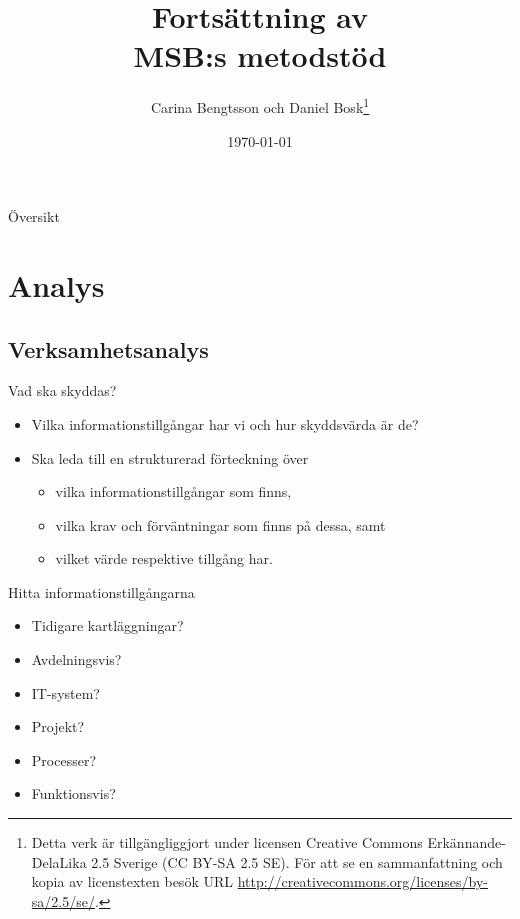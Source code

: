 \documentclass{beamer}
\title[Intro infosäk]{%
  Fortsättning av\\
  MSB:s metodstöd
}
\author{Carina Bengtsson och Daniel Bosk\footnote{%
  Detta verk är tillgängliggjort under licensen Creative Commons 
  Erkännande-DelaLika 2.5 Sverige (CC BY-SA 2.5 SE).
	För att se en sammanfattning och kopia av licenstexten besök URL 
	\url{http://creativecommons.org/licenses/by-sa/2.5/se/}.
}}
\institute[MIUN ITM]{%
  Avdelningen för informations- och kommunikationssytem (IKS),\\
	Institutionen för informationsteknologi och medier (ITM),\\
	Mittuniversitetet, Sundsvall.
}
\date{\today}
\begin{document}
\begin{frame}
  \titlepage{}
\end{frame}

\begin{frame}{Översikt}
  \begin{multicols}{2}
    \tableofcontents
  \end{multicols}
\end{frame}




\section{Analys}

\subsection{Verksamhetsanalys}

\begin{frame}{Vad ska skyddas?}
  \begin{itemize}
    \item Vilka informationstillgångar har vi och hur skyddsvärda är de?
    \item Ska leda till en strukturerad förteckning över
      \begin{itemize}
        \item vilka informationstillgångar som finns,
        \item vilka krav och förväntningar som finns på dessa, samt
        \item vilket värde respektive tillgång har.
      \end{itemize}
  \end{itemize}
\end{frame}

\begin{frame}{Hitta informationstillgångarna}
  \begin{itemize}
    \item Tidigare kartläggningar?
    \item Avdelningsvis?
    \item IT-system?
    \item Projekt?
    \item Processer?
    \item Funktionsvis?
  \end{itemize}
\end{frame}
\end{document}
